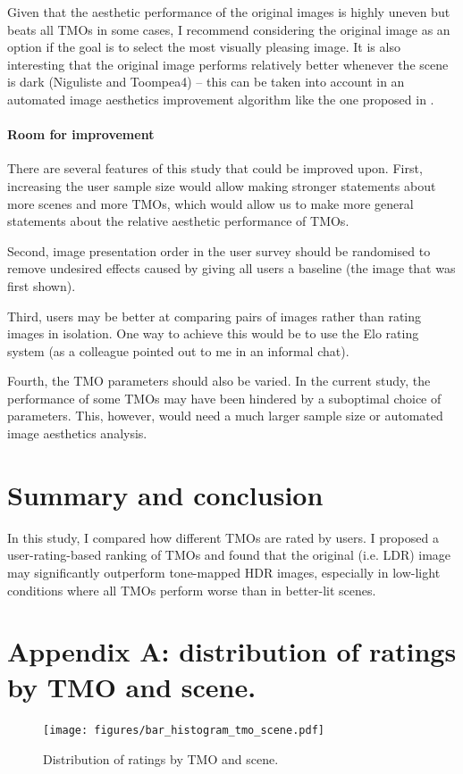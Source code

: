 \documentclass[a4paper]{scrartcl}
\begin{document}
Given that the aesthetic performance of the original images is highly uneven but beats all TMOs in some cases, I recommend considering the original image as an option if the goal is to select the most visually pleasing image. It is also interesting that the original image performs relatively better whenever the scene is dark (Niguliste and Toompea4) -- this can be taken into account in an automated image aesthetics improvement algorithm like the one proposed in \cite{aydin2015automated}.

\paragraph{Room for improvement}

There are several features of this study that could be improved upon. First, increasing the user sample size would allow making stronger statements about more scenes and more TMOs, which would allow us to make more general statements about the relative aesthetic performance of TMOs.

Second, image presentation order in the user survey should be randomised to remove undesired effects caused by giving all users a baseline (the image that was first shown).

Third, users may be better at comparing pairs of images rather than rating images in isolation. One way to achieve this would be to use the Elo rating system (as a colleague pointed out to me in an informal chat).

Fourth, the TMO parameters should also be varied. In the current study, the performance of some TMOs may have been hindered by a suboptimal choice of parameters. This, however, would need a much larger sample size or automated image aesthetics analysis.


\section{Summary and conclusion}

In this study, I compared how different TMOs are rated by users. I proposed a user-rating-based ranking of TMOs and found that the original (i.e. LDR) image may significantly outperform tone-mapped HDR images, especially in low-light conditions where all TMOs perform worse than in better-lit scenes.

\newpage




\newpage\section*{Appendix A: distribution of ratings by TMO and scene.}
\begin{figure}[h!]
\centering
\texttt{[image: figures/bar\_histogram\_tmo\_scene.pdf]}
\caption{Distribution of ratings by TMO and scene.}
\label{fig:bar_histogram_tmo_scene}
\end{figure}
\end{document}
